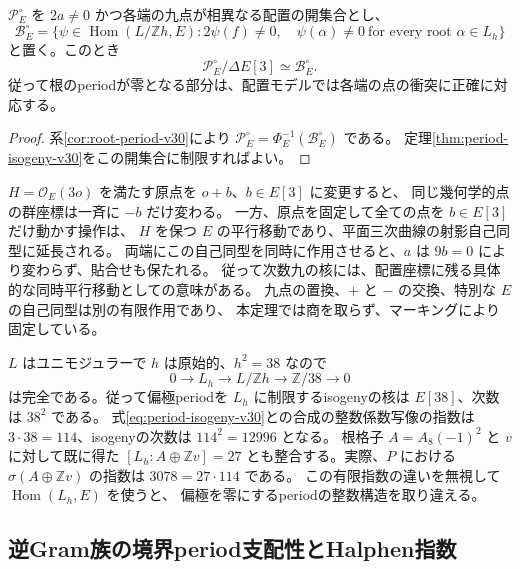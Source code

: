 \begin{corollary}[良い配置のperiod開集合]
\label{cor:period-open-v30}
$\mathcal P_E^\circ$ を $2a\ne0$ かつ各端の九点が相異なる配置の開集合とし、
\[
 \mathcal B_E^\circ=
 \{\psi\in\operatorname{Hom}(L/\mathbb Zh,E):
      2\psi(f)\ne0,\quad
      \psi(\alpha)\ne0\ \text{for every root }\alpha\in L_h\}
\]
と置く。このとき
\[
 \mathcal P_E^\circ/\Delta E[3]\simeq\mathcal B_E^\circ.
\]
従って根のperiodが零となる部分は、配置モデルでは各端の点の衝突に正確に対応する。
\end{corollary}

\begin{proof}
系\ref{cor:root-period-v30}により
$\mathcal P_E^\circ=\Phi_E^{-1}(\mathcal B_E^\circ)$ である。
定理\ref{thm:period-isogeny-v30}をこの開集合に制限すればよい。
\end{proof}

\begin{remark}[原点変更と残る有限対称性]
$H=\mathcal O_E(3o)$ を満たす原点を $o+b$、$b\in E[3]$ に変更すると、
同じ幾何学的点の群座標は一斉に $-b$ だけ変わる。
一方、原点を固定して全ての点を $b\in E[3]$ だけ動かす操作は、
$H$ を保つ $E$ の平行移動であり、平面三次曲線の射影自己同型に延長される。
両端にこの自己同型を同時に作用させると、$a$ は
$9b=0$ により変わらず、貼合せも保たれる。
従って次数九の核には、配置座標に残る具体的な同時平行移動としての意味がある。
九点の置換、$+$ と $-$ の交換、特別な $E$ の自己同型は別の有限作用であり、
本定理では商を取らず、マーキングにより固定している。
\end{remark}

\begin{remark}[直交格子への制限]
\label{rem:period-index38-v30}
$L$ はユニモジュラーで $h$ は原始的、$h^2=38$ なので
\[
 0\longrightarrow L_h\longrightarrow L/\mathbb Zh
       \longrightarrow\mathbb Z/38\longrightarrow0
\]
は完全である。従って偏極periodを $L_h$ に制限するisogenyの核は
$E[38]$、次数は $38^2$ である。
式\eqref{eq:period-isogeny-v30}との合成の整数係数写像の指数は
$3\cdot38=114$、isogenyの次数は $114^2=12996$ となる。
根格子 $A=A_8(-1)^2$ と $v$ に対して既に得た
$[L_h:A\oplus\mathbb Zv]=27$ とも整合する。実際、$P$ における
$\sigma(A\oplus\mathbb Zv)$ の指数は $3078=27\cdot114$ である。
この有限指数の違いを無視して $\operatorname{Hom}(L_h,E)$ を使うと、
偏極を零にするperiodの整数構造を取り違える。
\end{remark}

\subsection{逆Gram族の境界period支配性とHalphen指数}

